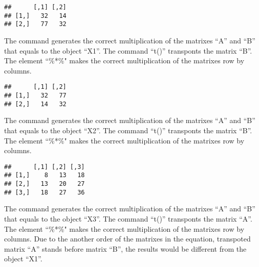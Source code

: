 \documentclass[12pt,]{article}
\newenvironment{Shaded}{\begin{snugshade}}{\end{snugshade}}
\newcommand{\KeywordTok}[1]{\textcolor[rgb]{0.13,0.29,0.53}{\textbf{#1}}}
\newcommand{\OperatorTok}[1]{\textcolor[rgb]{0.81,0.36,0.00}{\textbf{#1}}}
\newcommand{\NormalTok}[1]{#1}
\begin{document}
\begin{Shaded}
\end{Shaded}

\begin{verbatim}
##      [,1] [,2]
## [1,]   32   14
## [2,]   77   32
\end{verbatim}

The command generates the correct multiplication of the matrixes ``A''
and ``B'' that equals to the object ``X1''. The command ``t()''
transponts the matrix ``B''. The element ``\%*\%" makes the correct
multiplication of the matrixes row by columns.

\begin{Shaded}
\end{Shaded}

\begin{verbatim}
##      [,1] [,2]
## [1,]   32   77
## [2,]   14   32
\end{verbatim}

The command generates the correct multiplication of the matrixes ``A''
and ``B'' that equals to the object ``X2''. The command ``t()''
transponts the matrix ``B''. The element ``\%*\%" makes the correct
multiplication of the matrixes row by columns.

\begin{Shaded}
\end{Shaded}

\begin{verbatim}
##      [,1] [,2] [,3]
## [1,]    8   13   18
## [2,]   13   20   27
## [3,]   18   27   36
\end{verbatim}

The command generates the correct multiplication of the matrixes ``A''
and ``B'' that equals to the object ``X3''. The command ``t()''
transponts the matrix ``A''. The element ``\%*\%" makes the correct
multiplication of the matrixes row by columns. Due to the another order
of the matrixes in the equation, transpoted matrix ``A'' stands before
matrix ``B'', the results would be different from the object ``X1''.
\end{document}
